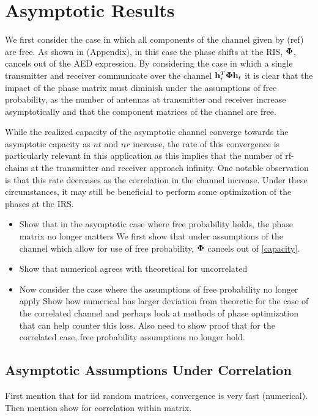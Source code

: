 \documentclass[12pt,a4paper]{report}
\begin{document}
\section{Asymptotic Results}
We first consider the case in which all components of the channel given by (ref) are free. As shown in (Appendix), in this case the 
phase shifts at the RIS, $\boldsymbol{\Phi}$, cancels out of the AED expression. 
By considering the case in which a single transmitter and receiver communicate over the channel $\mathbf{h}_r^T \boldsymbol{\Phi} \mathbf{h}_t$ it is clear that
the impact of the phase matrix must diminish under the assumptions of free probability, \ie  as the number of antennas at transmitter and receiver increase asymptotically and that the component matrices of the channel are free. 
\par
While the realized capacity of the asymptotic channel converge towards the asymptotic capacity as $nt$ and $nr$ increase, the rate of this convergence is particularly relevant in this application as this implies that the number of rf-chains at the transmitter and receiver approach infinity. One notable observation is that this rate
decreases as the correlation in the channel increase. Under these circumstances, it may still be beneficial to perform some optimization of the phases at the IRS. 
\begin{itemize}
\item 
	
	Show that in the asymptotic case where free probability holds, the phase matrix no longer matters
	We first show that under assumptions of the channel which allow for use of free probability, $\boldsymbol{\Phi}$
	cancels out of \eqref{capacity}.
	
\item
	Show that numerical agrees with theoretical for uncorrelated 
\item
	Now consider the case where the assumptions of free probability no longer apply 
	Show how numerical has larger deviation from theoretic for the case of the correlated channel and perhaps 
	look at methods of phase optimization that can help counter this loss. Also need to show proof that for the
	correlated case, free probability assumptions no longer hold. 
\end{itemize}
\subsection{Asymptotic Assumptions Under Correlation}
First mention that for iid random matrices, convergence is very fast (numerical). Then mention show for correlation within matrix. 
\end{document}
